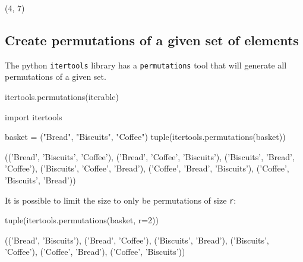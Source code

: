 \begin{raw}
(4, 7)
\end{raw}





\subsection{Create permutations of a given set of elements}
\label{\detokenize{tools-for-mathematics/05-combinations-permutations/how/main:creating-permutations-of-a-given-set-of-elements}}

The python \texttt{itertools} library has a \texttt{permutations} tool that will generate all
permutations of a given set.


\begin{api}
itertools.permutations(iterable)
\end{api}





\begin{pyin}
import itertools

basket = ("Bread", "Biscuits", "Coffee")
tuple(itertools.permutations(basket))
\end{pyin}





\begin{raw}
(('Bread', 'Biscuits', 'Coffee'),
 ('Bread', 'Coffee', 'Biscuits'),
 ('Biscuits', 'Bread', 'Coffee'),
 ('Biscuits', 'Coffee', 'Bread'),
 ('Coffee', 'Bread', 'Biscuits'),
 ('Coffee', 'Biscuits', 'Bread'))
\end{raw}





It is possible to limit the size to only be permutations of size \texttt{r}:




\begin{pyin}
tuple(itertools.permutations(basket, r=2))
\end{pyin}





\begin{raw}
(('Bread', 'Biscuits'),
 ('Bread', 'Coffee'),
 ('Biscuits', 'Bread'),
 ('Biscuits', 'Coffee'),
 ('Coffee', 'Bread'),
 ('Coffee', 'Biscuits'))
\end{raw}






